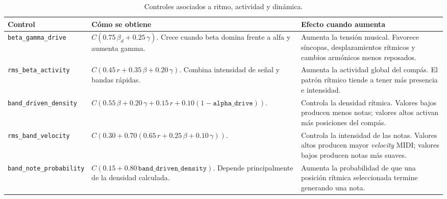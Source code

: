 \documentclass[../main.tex]{subfiles}
\begin{document}
\begin{table}[H]
    \centering
    \caption{Controles asociados a ritmo, actividad y dinámica.}
    \label{tab:impl_sonificacion_controles_ritmo}
    \footnotesize
    \setlength{\tabcolsep}{3pt}
    \renewcommand{\arraystretch}{1.10}
    \begin{tabular}{p{}p{}p{}}
        \hline
        \textbf{Control} & \textbf{Cómo se obtiene} & \textbf{Efecto cuando aumenta} \\
        \hline

        \texttt{beta\_gamma\_drive} &
        \(C(0.75\,\beta_d + 0.25\,\gamma)\). Crece cuando beta domina frente a alfa y aumenta gamma. &
        Aumenta la tensión musical. Favorece síncopas, desplazamientos rítmicos y cambios armónicos menos reposados. \\

        \texttt{rms\_beta\_activity} &
        \(C(0.45\,r + 0.35\,\beta + 0.20\,\gamma)\). Combina intensidad de señal y bandas rápidas. &
        Aumenta la actividad global del compás. El patrón rítmico tiende a tener más presencia e intensidad. \\

        \texttt{band\_driven\_density} &
        \(C(0.55\,\beta + 0.20\,\gamma + 0.15\,r + 0.10(1-\texttt{alpha\_drive}))\). &
        Controla la densidad rítmica. Valores bajos producen menos notas; valores altos activan más posiciones del compás. \\

        \texttt{rms\_band\_velocity} &
        \(C(0.30 + 0.70(0.65\,r + 0.25\,\beta + 0.10\,\gamma))\). &
        Controla la intensidad de las notas. Valores altos producen mayor \textit{velocity} MIDI; valores bajos producen notas más suaves. \\

        \texttt{band\_note\_probability} &
        \(C(0.15 + 0.80\,\texttt{band\_driven\_density})\). Depende principalmente de la densidad calculada. &
        Aumenta la probabilidad de que una posición rítmica seleccionada termine generando una nota. \\
        \hline
    \end{tabular}
\end{table}
\end{document}
